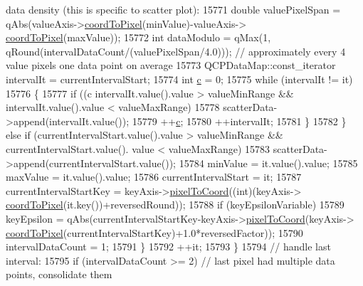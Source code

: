 \begin{DoxyCode}
{       data density (this is specific to scatter plot):}
15771             \textcolor{keywordtype}{double} valuePixelSpan = qAbs(valueAxis->\hyperlink{class_q_c_p_axis_a985ae693b842fb0422b4390fe36d299a}{coordToPixel}(minValue)-valueAxis->
      \hyperlink{class_q_c_p_axis_a985ae693b842fb0422b4390fe36d299a}{coordToPixel}(maxValue));
15772             \textcolor{keywordtype}{int} dataModulo = qMax(1, qRound(intervalDataCount/(valuePixelSpan/4.0))); \textcolor{comment}{// approximately
       every 4 value pixels one data point on average}
15773             QCPDataMap::const\_iterator intervalIt = currentIntervalStart;
15774             \textcolor{keywordtype}{int} \hyperlink{_comparision_pictures_2_createtest_image_8m_ae0323a9039add2978bf5b49550572c7c}{c} = 0;
15775             \textcolor{keywordflow}{while} (intervalIt != it)
15776             \{
15777               \textcolor{keywordflow}{if} ((c %
      intervalIt.value().value > valueMinRange && intervalIt.value().value < valueMaxRange)
15778                 scatterData->append(intervalIt.value());
15779               ++\hyperlink{_comparision_pictures_2_createtest_image_8m_ae0323a9039add2978bf5b49550572c7c}{c};
15780               ++intervalIt;
15781             \}
15782           \} \textcolor{keywordflow}{else} \textcolor{keywordflow}{if} (currentIntervalStart.value().value > valueMinRange && currentIntervalStart.value().
      value < valueMaxRange)
15783             scatterData->append(currentIntervalStart.value());
15784           minValue = it.value().value;
15785           maxValue = it.value().value;
15786           currentIntervalStart = it;
15787           currentIntervalStartKey = keyAxis->\hyperlink{class_q_c_p_axis_ae9289ef7043b9d966af88eaa95b037d1}{pixelToCoord}((\textcolor{keywordtype}{int})(keyAxis->
      \hyperlink{class_q_c_p_axis_a985ae693b842fb0422b4390fe36d299a}{coordToPixel}(it.key())+reversedRound));
15788           \textcolor{keywordflow}{if} (keyEpsilonVariable)
15789             keyEpsilon = qAbs(currentIntervalStartKey-keyAxis->\hyperlink{class_q_c_p_axis_ae9289ef7043b9d966af88eaa95b037d1}{pixelToCoord}(keyAxis->
      \hyperlink{class_q_c_p_axis_a985ae693b842fb0422b4390fe36d299a}{coordToPixel}(currentIntervalStartKey)+1.0*reversedFactor));
15790           intervalDataCount = 1;
15791         \}
15792         ++it;
15793       \}
15794       \textcolor{comment}{// handle last interval:}
15795       \textcolor{keywordflow}{if} (intervalDataCount >= 2) \textcolor{comment}{// last pixel had multiple data points, consolidate them}

\end{DoxyCode}
